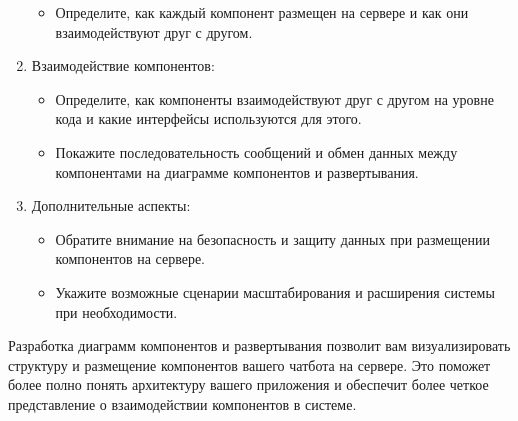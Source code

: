 \documentclass[letterpaper,10pt,russian]{sphinxmanual}
\begin{document}
\begin{enumerate}
\begin{itemize}
\item {} 
\sphinxAtStartPar
Определите, как каждый компонент размещен на сервере и как они взаимодействуют друг с другом.

\end{itemize}

\item {} 
\sphinxAtStartPar
Взаимодействие компонентов:
\begin{itemize}
\item {} 
\sphinxAtStartPar
Определите, как компоненты взаимодействуют друг с другом на уровне кода и какие интерфейсы используются для этого.

\item {} 
\sphinxAtStartPar
Покажите последовательность сообщений и обмен данных между компонентами на диаграмме компонентов и развертывания.

\end{itemize}

\item {} 
\sphinxAtStartPar
Дополнительные аспекты:
\begin{itemize}
\item {} 
\sphinxAtStartPar
Обратите внимание на безопасность и защиту данных при размещении компонентов на сервере.

\item {} 
\sphinxAtStartPar
Укажите возможные сценарии масштабирования и расширения системы при необходимости.

\end{itemize}

\end{enumerate}

\sphinxAtStartPar
Разработка диаграмм компонентов и развертывания позволит вам визуализировать структуру и размещение компонентов вашего чат\sphinxhyphen{}бота на сервере. Это поможет более полно понять архитектуру вашего приложения и обеспечит более четкое представление о взаимодействии компонентов в системе.
\end{document}
